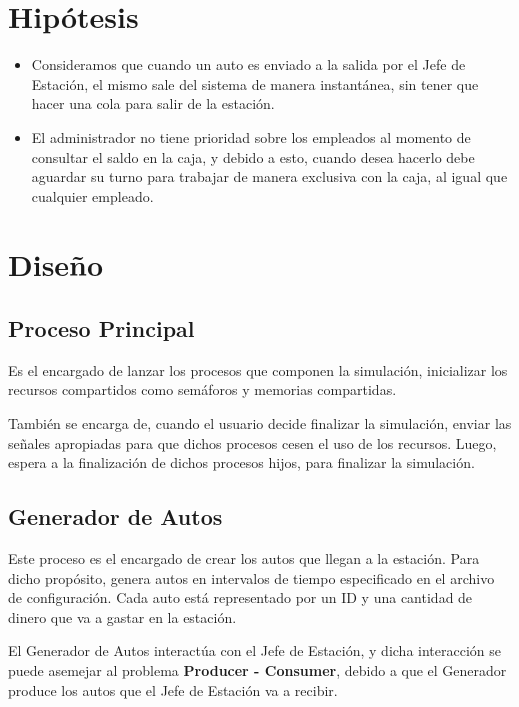 \documentclass[12pt,a4paper,spanish]{article}
\begin{document}

\newpage
\tableofcontents

\section{Hipótesis}

\begin{itemize}
	\item Consideramos que cuando un auto es enviado a la salida por el Jefe de Estación,
	el mismo sale del sistema de manera instantánea, sin tener que hacer una cola
	para salir de la estación.

	\item El administrador no tiene prioridad sobre los empleados al momento de consultar
	el saldo en la caja, y debido a esto, cuando desea hacerlo debe aguardar su turno para
	trabajar de manera exclusiva con la caja, al igual que cualquier empleado.
\end{itemize}

\newpage

\section{Diseño}
	\subsection{Proceso Principal}

		Es el encargado de lanzar los procesos que componen la simulación, inicializar los recursos
		compartidos como semáforos y memorias compartidas.

		También se encarga de, cuando el usuario decide finalizar la simulación, enviar las señales
		apropiadas para que dichos procesos cesen el uso de los recursos. Luego, espera a la finalización
		de dichos procesos hijos, para finalizar la simulación.

	\subsection{Generador de Autos}
		
		Este proceso es el encargado de crear los autos que llegan a la estación. Para
		dicho propósito, genera autos en intervalos de tiempo especificado en el archivo de configuración. 
		Cada auto está representado por un ID y una cantidad de dinero que va a gastar en la estación.

		El Generador de Autos interactúa con el Jefe de Estación, y dicha interacción se puede
		asemejar al problema \textbf{Producer - Consumer}, debido a que el Generador produce
		los autos que el Jefe de Estación va a recibir. 
\end{document}
